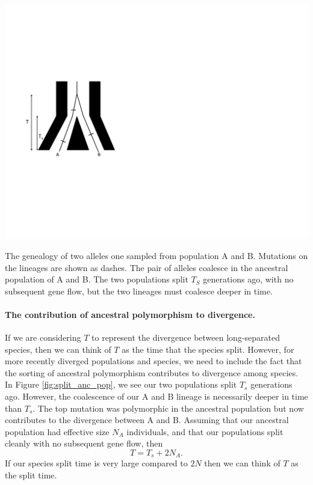 \begin{marginfigure}
\begin{center}
\includegraphics[width=0.8 \textwidth]{figures/Genetic_drift/ILS/split_anc_pop.pdf}
\end{center}
\caption{The genealogy of two alleles one sampled from population A and B. Mutations on the lineages are shown as dashes. The pair of alleles coalesce in the ancestral population of A and B. The two populations split $T_S$ generations ago, with no subsequent gene flow, but the two lineages must coalesce deeper in time. } \label{fig:split_anc_pop}  
\end{marginfigure} 


\paragraph{The contribution of ancestral polymorphism to divergence.} If we are considering $T$ to represent the divergence between long-separated species, then we can think of $T$ as the time that the
species split. However, for more recently diverged populations and
species, we need to include the fact that the sorting of ancestral
polymorphism contributes to divergence among species. In Figure 
\ref{fig:split_anc_pop}, we see our two populations split $T_s$ generations ago.  However, the
coalescence of our A and B lineage is necessarily deeper in time than
$T_s$. The top mutation was polymorphic in the ancestral population
but now contributes to the divergence between A and B. Assuming that
our ancestral population had effective size $N_A$ individuals, and
that our populations split cleanly with no subsequent gene flow, then
\begin{equation}
T = T_s + 2N_A.
\end{equation}
If our species split time is very large compared to $2N$ then we can think of $T$ as the split time. 

